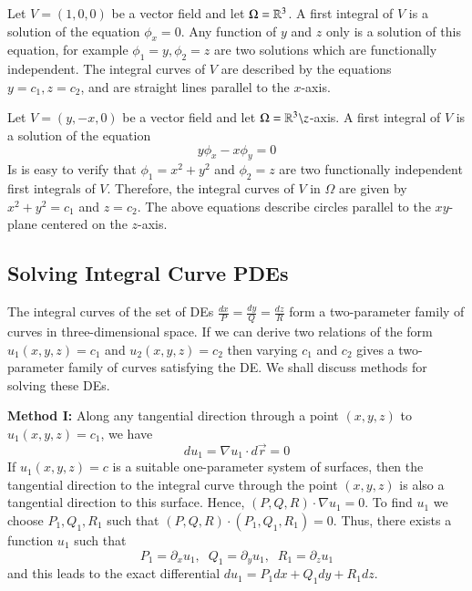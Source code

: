 \documentclass[12pt, a4paper, oneside, openright, titlepage]{book}
\begin{document}
\begin{appendices}
    \begin{eg}
        Let $V = (1,0,0)$ be a vector field and let $\Omega = \mathbb R^3$. A first integral of $V$ is a solution of the equation $\phi_x = 0$. Any function of $y$ and $z$ only is a solution of this equation, for example $\phi_1 = y,\phi_2 = z$ are two solutions which are functionally independent. The integral curves of $V$ are described by the equations $y = c_1, z = c_2$, and are straight lines parallel to the $x$-axis.
    \end{eg}

    \begin{eg}
        Let $V = (y,-x,0)$ be a vector field and let $\Omega = \mathbb R^3\backslash z$-axis. A first integral of $V$ is a solution of the equation \begin{equation*}
            y\phi_x - x\phi_y = 0
        \end{equation*}
        Is is easy to verify that $\phi_1 = x^2+y^2$ and $\phi_2 = z$ are two functionally independent first integrals of $V$. Therefore, the integral curves of $V$ in $\Omega$ are given by $x^2+y^2=c_1$ and $z=c_2$. The above equations describe circles parallel to the $xy$-plane centered on the $z$-axis.
    \end{eg}


    \subsection{Solving Integral Curve PDEs}

    The integral curves of the set of DEs $\frac{dx}{P} = \frac{dy}{Q} = \frac{dz}{R}$ form a two-parameter family of curves in three-dimensional space. If we can derive two relations of the form $u_1(x,y,z) = c_1$ and $u_2(x,y,z) = c_2$ then varying $c_1$ and $c_2$ gives a two-parameter family of curves satisfying the DE. We shall discuss methods for solving these DEs.

    \textbf{Method I:} Along any tangential direction through a point $(x,y,z)$ to $u_1(x,y,z) = c_1$, we have \begin{equation*}
        du_1 = \nabla u_1 \cdot d\vec{r} = 0
    \end{equation*}
    If $u_1(x,y,z) = c$ is a suitable one-parameter system of surfaces, then the tangential direction to the integral curve through the point $(x,y,z)$ is also a tangential direction to this surface. Hence, $(P,Q,R)\cdot \nabla u_1 = 0$. To find $u_1$ we choose $P_1,Q_1,R_1$ such that $(P,Q,R) \cdot (P_1,Q_1,R_1) = 0$. Thus, there exists a function $u_1$ such that \begin{equation*}
        P_1 = \partial_xu_1,\;\;Q_1 = \partial_yu_1,\;\;R_1 = \partial_zu_1
    \end{equation*}
    and this leads to the exact differential $du_1 = P_1dx+Q_1dy+R_1dz$.



\end{appendices}
\end{document}
